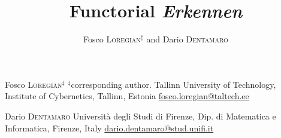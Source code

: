 \documentclass[a4paper,9pt]{../birkjour}
\title{Functorial \emph{Erkennen}}
\author{Fosco \textsc{Loregian}$^\ddag$ and Dario \textsc{Dentamaro}}
\begin{document}
\scriptsize

\maketitle

\begin{minipage}{.4\textwidth}
  Fosco \textsc{Loregian}$^\ddag$\newline 
  $^\ddag$corresponding author. \newline 
Tallinn University of Technology,\newline %
Institute of Cybernetics,\newline 
Tallinn, Estonia \newline
\url{fosco.loregian@taltech.ee}
\end{minipage}\hfill %
\begin{minipage}{.4\textwidth}
  Dario \textsc{Dentamaro} \newline 
  Università degli Studi di Firenze,\newline 
  Dip. di Matematica e Informatica, \newline 
  Firenze, Italy\newline
  \url{dario.dentamaro@stud.unifi.it}
\end{minipage}
\end{document}

